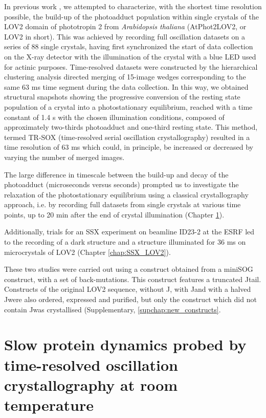 In previous work \parencite{aumonierMillisecondTimeresolvedSerial2020}, we attempted to characterize, with the shortest time resolution possible, the build-up of the photoadduct population within single crystals of the LOV2 domain of phototropin 2 from \textit{Arabidopsis thaliana} (AtPhot2LOV2, or LOV2 in short). This was achieved by recording full oscillation datasets on a series of 88 single crystals, having first synchronized the start of data collection on the X-ray detector with the illumination of the crystal with a blue LED used for actinic purposes. Time-resolved datasets were constructed by the hierarchical clustering analysis directed merging of 15-image wedges corresponding to the same 63 ms time segment during the data collection. In this way, we obtained structural snapshots showing the progressive conversion of the resting state population of a crystal into a photostationary equilibrium, reached with a time constant of 1.4 s with the chosen illumination conditions, composed of approximately two-thirds photoadduct and one-third resting state. This method, termed TR-SOX (time-resolved serial oscillation crystallography) resulted in a time resolution of 63 ms which could, in principle, be increased or decreased by varying the number of merged images. 

The large difference in timescale between the build-up and decay of the photoadduct (microseconds versus seconds) prompted us to investigate the relaxation of the photostationary equilibrium using a classical crystallography approach, i.e. by recording full datasets from single crystals at various time points, up to 20 min after the end of crystal illumination (Chapter \ref{chap:slowprot}).

Additionally, trials for an SSX experiment on beamline ID23-2 at the ESRF \parencite{nanaoID232AutomatedHighperformance2022} led to the recording of a dark structure and a structure illuminated for 36 ms on microcrystals of LOV2 (Chapter \ref{chap:SSX_LOV2}). 

These two studies were carried out using a construct obtained from a miniSOG \parencite{torraTailingMiniSOGStructural2019} construct, with a set of back-mutations. This construct features a truncated J\textalpha tail. Constructs of the original LOV2 sequence, without J\textalpha, with J\textalpha and with a halved J\textalpha were also ordered, expressed and purified, but only the construct which did not contain J\textalpha was crystallised (Supplementary, \ref{supchap:new_constructs}. 

\chapter{Slow protein dynamics probed by time-resolved oscillation crystallography at room temperature}\label{chap:slowprot}
\vspace{10mm}

